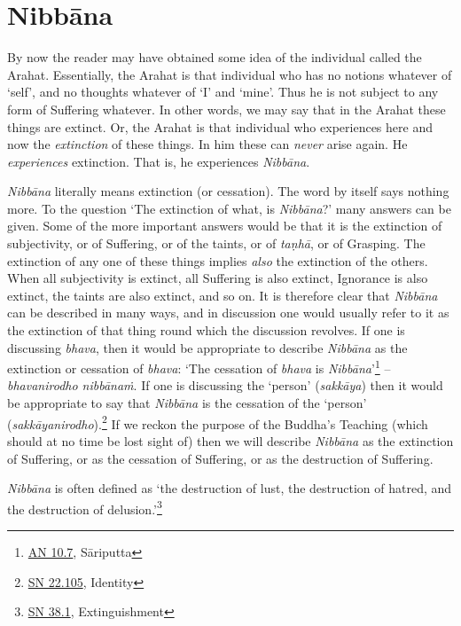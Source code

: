 \chapter{Nibbāna}

By now the reader may have obtained some idea of the individual called the Arahat. Essentially, the Arahat is that individual who has no notions whatever of `self', and no thoughts whatever of `I' and `mine'. Thus he is not subject to any form of Suffering whatever. In other words, we may say that in the Arahat these things are extinct. Or, the Arahat is that individual who experiences here and now the \emph{extinction} of these things. In him these can \emph{never} arise again. He \emph{experiences} extinction. That is, he experiences \textit{Nibbāna}.

\textit{Nibbāna} literally means extinction (or cessation). The word by itself says nothing more. To the question `The extinction of what, is \textit{Nibbāna}?' many answers can be given. Some of the more important answers would be that it is the extinction of subjectivity, or of Suffering, or of the taints, or of \textit{taṇhā}, or of Grasping. The extinction of any one of these things implies \emph{also} the extinction of the others. When all subjectivity is extinct, all Suffering is also extinct, Ignorance is also extinct, the taints are also extinct, and so on. It is therefore clear that \textit{Nibbāna} can be described in many ways, and in discussion one would usually refer to it as the extinction of that thing round which the discussion revolves. If one is discussing \textit{bhava}, then it would be appropriate to describe \textit{Nibbāna} as the extinction or cessation of \textit{bhava}: `The cessation of \textit{bhava} is \textit{Nibbāna}'\footnote{\href{https://suttacentral.net/an10.7/en/bodhi}{AN 10.7}, Sāriputta} -- \textit{bhavanirodho nibbānaṁ}. If one is discussing the `person' (\textit{sakkāya}) then it would be appropriate to say that \textit{Nibbāna} is the cessation of the `person' (\textit{sakkāyanirodho}).\footnote{\href{https://suttacentral.net/sn22.105/en/sujato}{SN 22.105}, Identity} If we reckon the purpose of the Buddha's Teaching (which should at no time be lost sight of) then we will describe \textit{Nibbāna} as the extinction of Suffering, or as the cessation of Suffering, or as the destruction of Suffering.

\textit{Nibbāna} is often defined as `the destruction of lust, the destruction of hatred, and the destruction of delusion.'\footnote{\href{https://suttacentral.net/sn38.1/en/sujato}{SN 38.1}, Extinguishment}

